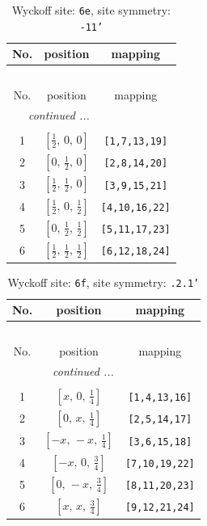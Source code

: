 \documentclass[fleqn,8pt]{jsarticle}
\begin{document}
\renewcommand{\arraystretch}{1.2}
\begin{longtable}{ccc}
\caption{Wyckoff site: {\tt 6e}, site symmetry: {\tt -11'}}
 \\
 \hline \hline
No. & position & mapping \\ \hline \endfirsthead

\multicolumn{2}{l}{\tablename\ \thetable{}} \\
 \hline \hline
No. & position & mapping \\ \hline \endhead

 \hline \hline
\multicolumn{2}{r}{\footnotesize\it continued ...} \\ \endfoot

 \hline \hline
\multicolumn{2}{r}{} \\ \endlastfoot

1 & $\left[ \frac{1}{2},\, 0,\, 0 \right]$ & {\tt [1,7,13,19]} \\ \hline
2 & $\left[ 0,\, \frac{1}{2},\, 0 \right]$ & {\tt [2,8,14,20]} \\ \hline
3 & $\left[ \frac{1}{2},\, \frac{1}{2},\, 0 \right]$ & {\tt [3,9,15,21]} \\ \hline
4 & $\left[ \frac{1}{2},\, 0,\, \frac{1}{2} \right]$ & {\tt [4,10,16,22]} \\ \hline
5 & $\left[ 0,\, \frac{1}{2},\, \frac{1}{2} \right]$ & {\tt [5,11,17,23]} \\ \hline
6 & $\left[ \frac{1}{2},\, \frac{1}{2},\, \frac{1}{2} \right]$ & {\tt [6,12,18,24]} \\
\end{longtable}
\renewcommand{\arraystretch}{1.2}
\begin{longtable}{ccc}
\caption{Wyckoff site: {\tt 6f}, site symmetry: {\tt .2.1'}}
 \\
 \hline \hline
No. & position & mapping \\ \hline \endfirsthead

\multicolumn{2}{l}{\tablename\ \thetable{}} \\
 \hline \hline
No. & position & mapping \\ \hline \endhead

 \hline \hline
\multicolumn{2}{r}{\footnotesize\it continued ...} \\ \endfoot

 \hline \hline
\multicolumn{2}{r}{} \\ \endlastfoot

1 & $\left[ x,\, 0,\, \frac{1}{4} \right]$ & {\tt [1,4,13,16]} \\ \hline
2 & $\left[ 0,\, x,\, \frac{1}{4} \right]$ & {\tt [2,5,14,17]} \\ \hline
3 & $\left[ - x,\, - x,\, \frac{1}{4} \right]$ & {\tt [3,6,15,18]} \\ \hline
4 & $\left[ - x,\, 0,\, \frac{3}{4} \right]$ & {\tt [7,10,19,22]} \\ \hline
5 & $\left[ 0,\, - x,\, \frac{3}{4} \right]$ & {\tt [8,11,20,23]} \\ \hline
6 & $\left[ x,\, x,\, \frac{3}{4} \right]$ & {\tt [9,12,21,24]} \\
\end{longtable}
\end{document}
